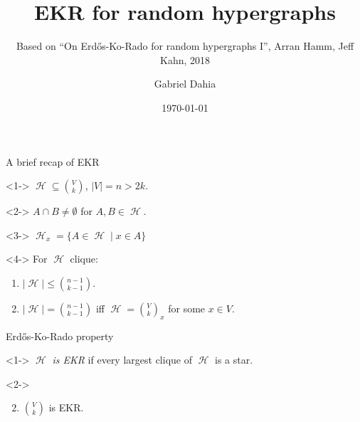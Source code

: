 \documentclass{beamer}
\title{EKR for random hypergraphs}
\subtitle{Based on ``On Erd\H{o}s-Ko-Rado for random hypergraphs I'', Arran Hamm, Jeff
  Kahn, 2018}
\author{Gabriel Dahia}
\institute{IMPA}
\date{\today}
\DeclareMathOperator{\Hy}{\mathcal{H}}
\newcommand{\V}[1]{{V \choose #1}}
\begin{document}
\begin{frame}
  \titlepage
\end{frame}

\begin{frame}{A brief recap of EKR}
  \begin{definition}<1->
    $\Hy \subseteq \V{k}$, $|V| = n > 2k$.
  \end{definition}

  \begin{definition}<2->
    $A \cap B \neq \emptyset$ for $A, B \in \Hy$.
  \end{definition}

  \begin{definition}[Star]<3->
    $\Hy_x = \{A \in \Hy \mid x \in A\}$
  \end{definition}

  \begin{theorem}<4->
    For $\Hy$ clique:
    \begin{enumerate}
      \item $|\Hy| \le {n - 1 \choose k - 1}$.
      \item<5-> $|\Hy| = {n - 1 \choose k - 1}$ iff $\Hy =
              \V{k}_x$ for some $x \in V$.
    \end{enumerate}
  \end{theorem}

\end{frame}

\begin{frame}{Erd\H{o}s-Ko-Rado property}

  \begin{definition}<1->
    $\Hy$ \emph{is EKR} if every largest clique of $\Hy$ is a star.
  \end{definition}

  \begin{theorem}<2->
    \begin{enumerate}
      \setcounter{enumi}{1}
      \item $\V{k}$ is EKR.
    \end{enumerate}
  \end{theorem}

\end{frame}
\end{document}
